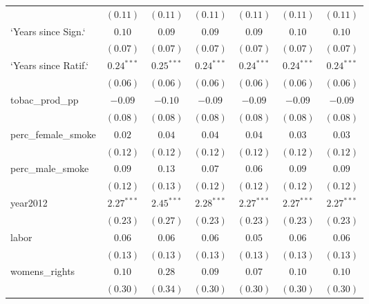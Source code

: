 \begin{table}[!h]
\begin{center}
\begin{tabular}{l c c c c c c }
                        & $(0.11)$     & $(0.11)$     & $(0.11)$     & $(0.11)$     & $(0.11)$     & $(0.11)$     \\
`Years since Sign.`     & $0.10$       & $0.09$       & $0.09$       & $0.09$       & $0.10$       & $0.10$       \\
                        & $(0.07)$     & $(0.07)$     & $(0.07)$     & $(0.07)$     & $(0.07)$     & $(0.07)$     \\
`Years since Ratif.`    & $0.24^{***}$ & $0.25^{***}$ & $0.24^{***}$ & $0.24^{***}$ & $0.24^{***}$ & $0.24^{***}$ \\
                        & $(0.06)$     & $(0.06)$     & $(0.06)$     & $(0.06)$     & $(0.06)$     & $(0.06)$     \\
tobac\_prod\_pp         & $-0.09$      & $-0.10$      & $-0.09$      & $-0.09$      & $-0.09$      & $-0.09$      \\
                        & $(0.08)$     & $(0.08)$     & $(0.08)$     & $(0.08)$     & $(0.08)$     & $(0.08)$     \\
perc\_female\_smoke     & $0.02$       & $0.04$       & $0.04$       & $0.04$       & $0.03$       & $0.03$       \\
                        & $(0.12)$     & $(0.12)$     & $(0.12)$     & $(0.12)$     & $(0.12)$     & $(0.12)$     \\
perc\_male\_smoke       & $0.09$       & $0.13$       & $0.07$       & $0.06$       & $0.09$       & $0.09$       \\
                        & $(0.12)$     & $(0.13)$     & $(0.12)$     & $(0.12)$     & $(0.12)$     & $(0.12)$     \\
year2012                & $2.27^{***}$ & $2.45^{***}$ & $2.28^{***}$ & $2.27^{***}$ & $2.27^{***}$ & $2.27^{***}$ \\
                        & $(0.23)$     & $(0.27)$     & $(0.23)$     & $(0.23)$     & $(0.23)$     & $(0.23)$     \\
labor                   & $0.06$       & $0.06$       & $0.06$       & $0.05$       & $0.06$       & $0.06$       \\
                        & $(0.13)$     & $(0.13)$     & $(0.13)$     & $(0.13)$     & $(0.13)$     & $(0.13)$     \\
womens\_rights          & $0.10$       & $0.28$       & $0.09$       & $0.07$       & $0.10$       & $0.10$       \\
                        & $(0.30)$     & $(0.34)$     & $(0.30)$     & $(0.30)$     & $(0.30)$     & $(0.30)$     \\

\end{tabular}
\end{center}
\end{table}
